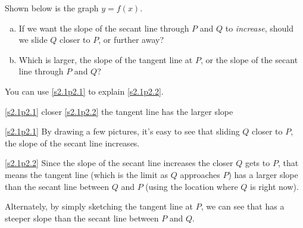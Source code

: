 \begin{Mquestion} Shown below is the graph $y=f(x)$.
\begin{enumerate}[(a)]
\item\label{s2.1p2.1} If we want the slope of the secant line through $P$ and $Q$ to \emph{increase}, should we slide $Q$ closer to $P$, or further away?
\item\label{s2.1p2.2} Which is larger, the slope of the tangent line at $P$, or the slope of the secant line through $P$ and $Q$?
\end{enumerate}
\begin{center}
\end{center}
\end{Mquestion}
\begin{hint} You can use \eqref{s2.1p2.1} to explain \eqref{s2.1p2.2}.
\end{hint}
\begin{answer}\eqref{s2.1p2.1} closer \qquad
\eqref{s2.1p2.2} the tangent line has the larger slope
\end{answer}
\begin{solution}\eqref{s2.1p2.1} By drawing a few pictures, it's easy to see that sliding $Q$ closer to $P$, the slope of the secant line increases.

\eqref{s2.1p2.2} Since the slope of the secant line increases the closer $Q$ gets to $P$, that means the tangent line (which is the limit as $Q$ approaches $P$) has a larger slope than the secant line between $Q$ and $P$ (using the location where $Q$ is right now).

Alternately, by simply sketching the tangent line at $P$, we can see that has a steeper slope than the secant line between $P$ and $Q$.
\end{solution}

